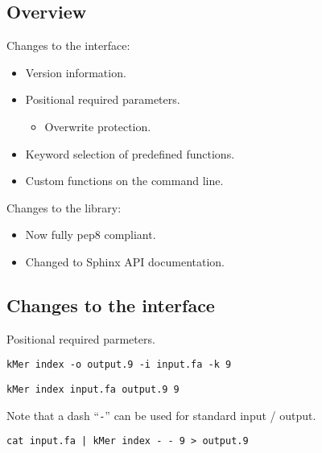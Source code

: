 \documentclass[slidestop]{beamer}
\begin{document}
\subsection{Overview}
\begin{pframe}
  Changes to the interface:
  \begin{itemize}
    \item Version information.
    \item Positional required parameters.
    \begin{itemize}
      \item Overwrite protection.
    \end{itemize}
    \item Keyword selection of predefined functions.
    \item Custom functions on the command line.
  \end{itemize}
  \bigskip
  \pause

  Changes to the library:
  \begin{itemize}
    \item Now fully pep8 compliant.
    \item Changed to Sphinx API documentation.

  \end{itemize}
\end{pframe}

\subsection{Changes to the interface}
\begin{pframe}
  Positional required parmeters.
  \bigskip

  \begin{lstlisting}[caption={Old style parameters.}]
    kMer index -o output.9 -i input.fa -k 9
  \end{lstlisting}

  \begin{lstlisting}[caption={New style parameters.}]
    kMer index input.fa output.9 9
  \end{lstlisting}
  \pause

  Note that a dash ``\lstinline{-}'' can be used for standard input / output.
  \medskip

  \begin{lstlisting}[caption={Piping and redirecting.}]
    cat input.fa | kMer index - - 9 > output.9
  \end{lstlisting}
\end{pframe}
\end{document}
